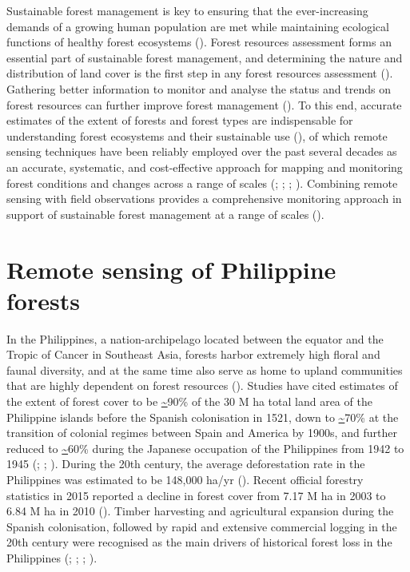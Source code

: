 Sustainable forest management is key to ensuring that the ever-increasing demands of a growing human population are met while maintaining ecological functions of healthy forest ecosystems (\cite{macdicken_global_2015}). Forest resources assessment forms an essential part of sustainable forest management, and determining the nature and distribution of land cover is the first step in any forest resources assessment (\cite{van_der_sanden_potential_1999}). Gathering better information to monitor and analyse the status and trends on forest resources can further improve forest management (\cite{siry_sustainable_2005}). To this end, accurate estimates of the extent of forests and forest types are indispensable for understanding forest ecosystems and their sustainable use (\cite{foody_remote_2003}), of which remote sensing techniques have been reliably employed over the past several decades as an accurate, systematic, and cost-effective approach for mapping and monitoring forest conditions and changes across a range of scales (\cite{myers_tropical_1988}; \cite{franklin_remote_2001}; \cite{dahdouh-guebas_use_2002}; \cite{boyd_satellite_2005}). Combining remote sensing with field observations provides a comprehensive monitoring approach in support of sustainable forest management at a range of scales (\cite{keenan_dynamics_2015}).

\section{Remote sensing of Philippine forests}
\label{sec: intro-rs-phil-forests}

In the Philippines, a nation-archipelago located between the equator and the Tropic of Cancer in Southeast Asia, forests harbor extremely high floral and faunal diversity, and at the same time also serve as home to upland communities that are highly dependent on forest resources (\cite{lasco_forest_2000}). Studies have cited estimates of the extent of forest cover to be \url{~}90\% of the 30 M ha total land area of the Philippine islands before the Spanish colonisation in 1521, down to \url{~}70\% at the transition of colonial regimes between Spain and America by 1900s, and further reduced to \url{~}60\% during the Japanese occupation of the Philippines from 1942 to 1945 (\cite{kummer_measuring_1992}; \cite{liu_rates_1993}; \cite{bankoff_one_2007}). During the 20th century, the average deforestation rate in the Philippines was estimated to be 148,000 ha/yr (\cite{lasco_forest_2000}). Recent official forestry statistics in 2015 reported a decline in forest cover from 7.17 M ha in 2003 to 6.84 M ha in 2010 (\cite{fmb_forestry_2015}). Timber harvesting and agricultural expansion during the Spanish colonisation, followed by rapid and extensive commercial logging in the 20th century were recognised as the main drivers of historical forest loss in the Philippines (\cite{eder_deforestation_1990}; \cite{kummer_measuring_1992}; \cite{chokkalingam_one_2006}; \cite{bankoff_one_2007}).\\

